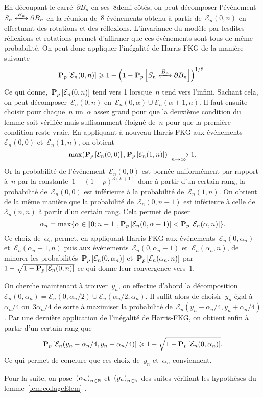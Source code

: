 	\begin{dem}
		En découpant le carré~$\partial B_n$ en ses~$8$demi côtés, on peut décomposer l'événement~$\relie[B_n]{S_n}{\partial B_n}$ en la réunion de~$8$ événements obtenu à partir de~$\mathcal{E}_n(0, n)$ en effectuant des rotations et des réflexions. L'invariance du modèle par lesdites réflexions et rotations permet d'affirmer que ces événements sont tous de même probabilité. On peut donc appliquer l'inégalité de Harris-FKG de la manière suivante
		\[
			\Pp{\mathcal{E}_n(0,n)} \geq 1 - \left(1 - \Pp{\relie[B_n]{S_n}{\partial B_n}} \right)^{1/8}.
		\]
		Ce qui donne,~$\bm{\mathrm{P}}_{p}\left[\mathcal{E}_n(0, n)\right]$ tend vers 1 lorsque~$n$ tend vers l'infini. Sachant cela, on peut décomposer~$\mathcal{E}_n(0, n)$ en~$\mathcal{E}_n(0, \alpha) \cup \mathcal{E}_n(\alpha + 1, n)$. Il faut ensuite choisir pour chaque~$n$ un~$\alpha$ assez grand pour que la deuxième condition du lemme soit vérifiée mais suffisamment éloigné de~$n$ pour que la première condition reste vraie. En appliquant à nouveau Harris-FKG aux événements~$\mathcal{E}_n(0, 0)$ et~$\mathcal{E}_n(1, n)$, on obtient
		\[
			\max(\bm{\mathrm{P}}_{p}\left[\mathcal{E}_n(0, 0)\right], \bm{\mathrm{P}}_{p}\left[\mathcal{E}_n(1, n)\right]) \xrightarrow[n \to \infty]{} 1.
		\]
		Or la probabilité de l'événement~$\mathcal{E}_n(0,0)$ est bornée uniformément par rapport à~$n$ par la constante~$1 - (1-p)^{3(k+1)}$ donc à partir d'un certain rang, la probabilité de~$\mathcal{E}_n(0,0)$ est inférieure à la probabilité de~$\mathcal{E}_n(1, n)$. On obtient de la même manière que la probabilité de~$\mathcal{E}_n(0, n-1)$ est inférieure à celle de~$\mathcal{E}_n(n, n)$ à partir d'un certain rang. Cela permet de poser
		\[
			\alpha_n = \max \{ \alpha \in \llbracket 0;n-1 \rrbracket, \bm{\mathrm{P}}_{p}\left[\mathcal{E}_n(0, \alpha - 1)\right] < \bm{\mathrm{P}}_{p}\left[\mathcal{E}_n(\alpha, n)\right] \}.
		\]
		Ce choix de~$\alpha_n$ permet, en appliquant Harris-FKG aux événements~$\mathcal{E}_n(0, \alpha_n)$ et~$\mathcal{E}_n(\alpha_n + 1, n)$ puis aux événements~$\mathcal{E}_n(0, \alpha_n - 1)$ et~$\mathcal{E}_n(\alpha_n, n)$, de minorer les probabilités~$\bm{\mathrm{P}}_{p}\left[\mathcal{E}_n(0, \alpha_n)\right]$ et~$\bm{\mathrm{P}}_{p}\left[\mathcal{E}_n(\alpha_n, n)\right]$ par~$1 - \sqrt{1  - \bm{\mathrm{P}}_{p}\left[\mathcal{E}_n(0, n)\right]}$ ce qui donne leur convergence vers~$1$. 

		On cherche maintenant à trouver~$y_n$, on effectue d'abord la décomposition~$\mathcal{E}_n(0, \alpha_n) = \mathcal{E}_n(0, \alpha_n/2) \cup \mathcal{E}_n(\alpha_n/2, \alpha_n)$. Il suffit alors de choisir~$y_n$ égal à $\alpha_n/4$ ou~$3\alpha_n/4$ de sorte à maximiser la probabilité de~$\mathcal{E}_n(y_n - \alpha_n/4, y_n + \alpha_n/4)$. Par une dernière application de l'inégalité de Harris-FKG, on obtient enfin à partir d'un certain rang que
		\[
			\bm{\mathrm{P}}_{p}\left[\mathcal{E}_n(y_n - \alpha_n/4, y_n + \alpha_n/4)\right] \geqslant 1 - \sqrt{1 - \bm{\mathrm{P}}_{p}\left[\mathcal{E}_n(0, \alpha_n)\right]}.
		\]
		Ce qui permet de conclure que ces choix de~$y_n$ et~$\alpha_n$ conviennent.
	\end{dem}
	Pour la suite, on pose~$\suite{\alpha}$ et~$\suite{y}$ des suites vérifiant les hypothèses du lemme~\ref{lem:collageElem} .

